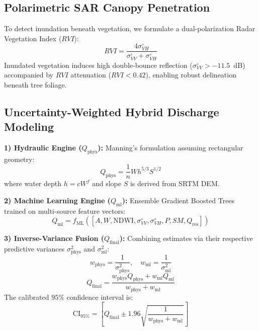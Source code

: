 \documentclass[conference]{IEEEtran}
\begin{document}
\subsection{Polarimetric SAR Canopy Penetration}
To detect inundation beneath vegetation, we formulate a dual-polarization Radar Vegetation Index ($RVI$):
\begin{equation}
RVI = \frac{4 \sigma^\circ_{VH}}{\sigma^\circ_{VV} + \sigma^\circ_{VH}}
\end{equation}
Inundated vegetation induces high double-bounce reflection ($\sigma^\circ_{VV} > -11.5$~dB) accompanied by $RVI$ attenuation ($RVI < 0.42$), enabling robust delineation beneath tree foliage.

\subsection{Uncertainty-Weighted Hybrid Discharge Modeling}
\textbf{1) Hydraulic Engine ($Q_{\text{phys}}$):} Manning's formulation assuming rectangular geometry:
\begin{equation}
Q_{\text{phys}} = \frac{1}{n} W h^{5/3} S^{1/2}
\end{equation}
where water depth $h = c W^f$ and slope $S$ is derived from SRTM DEM.

\textbf{2) Machine Learning Engine ($Q_{\text{ml}}$):} Ensemble Gradient Boosted Trees trained on multi-source feature vectors:
\begin{equation}
Q_{\text{ml}} = f_{\text{ML}}([A, W, \text{NDWI}, \sigma^\circ_{VV}, \sigma^\circ_{VH}, P, SM, Q_{\text{res}}])
\end{equation}

\textbf{3) Inverse-Variance Fusion ($Q_{\text{final}}$):} Combining estimates via their respective predictive variances $\sigma_{\text{phys}}^2$ and $\sigma_{\text{ml}}^2$:
\begin{equation}
w_{\text{phys}} = \frac{1}{\sigma_{\text{phys}}^2}, \quad w_{\text{ml}} = \frac{1}{\sigma_{\text{ml}}^2}
\end{equation}
\begin{equation}
Q_{\text{final}} = \frac{w_{\text{phys}} Q_{\text{phys}} + w_{\text{ml}} Q_{\text{ml}}}{w_{\text{phys}} + w_{\text{ml}}} \label{eq:fusion}
\end{equation}
The calibrated $95\%$ confidence interval is:
\begin{equation}
\text{CI}_{95\%} = \left[ Q_{\text{final}} \pm 1.96 \sqrt{\frac{1}{w_{\text{phys}} + w_{\text{ml}}}} \right]
\end{equation}
\end{document}
